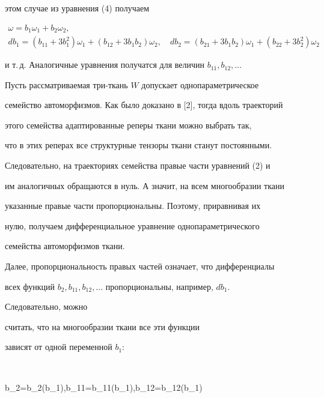 этом случае из уравнения (4) получаем 


\begin{equation} 


\begin{array}{c}


\omega=b_1\omega_1+b_2\omega_2,\\[2mm]


db_1=(b_{11}+3b^2_1)\omega_1+(b_{12}+3b_1b_2)\omega_2,\quad 


db_2=(b_{21}+3b_1b_2)\omega_1+(b_{22}+3b^2_2)\omega_2 


\end{array}


\end{equation} 


и т.\,д. Аналогичные уравнения получатся для величин $b_{11},b_{12},\dotsc$ 


 


Пусть рассматриваемая три-ткань $W$ допускает однопараметрическое 


семейство автоморфизмов. Как было доказано в [2], тогда вдоль траекторий 


этого семейства адаптированные реперы ткани можно выбрать так, 


что в этих реперах все структурные тензоры ткани станут постоянными. 


Следовательно, на траекториях семейства правые части уравнений (2) и 


им аналогичных обращаются в нуль. А значит, на всем многообразии ткани 


указанные правые части пропорциональны. Поэтому, приравнивая их 


нулю, получаем дифференциальное уравнение однопараметрического 


семейства автоморфизмов ткани. 


 


Далее, пропорциональность правых частей означает, что дифференциалы 


всех функций $b_2,b_{11},b_{12},\dotsc$ пропорциональны, например, $db_1$. 


Следовательно, можно 


считать, что на многообразии ткани все эти функции 


зависят от одной переменной $b_1$: 


$$ 


b_2=b_2(b_1),\quad b_{11}=b_{11}(b_1),\quad b_{12}=b_{12}(b_1) 


